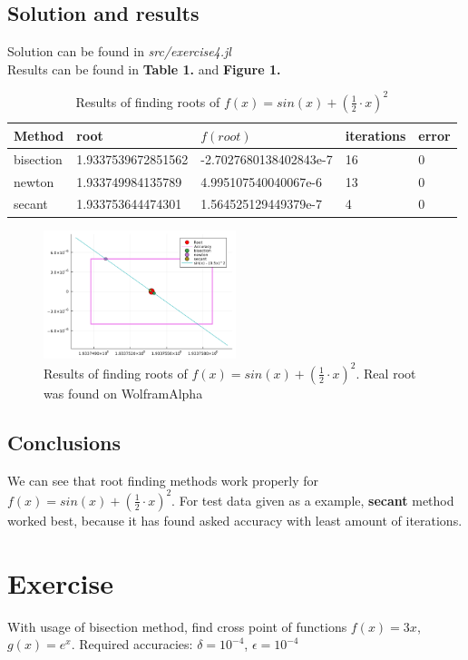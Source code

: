 \documentclass[11pt]{article}
\begin{document}
\subsection{Solution and results}
Solution can be found in \textit{src/exercise4.jl}\\
Results can be found in \textbf{Table 1.} and \textbf{Figure 1.}
\begin{table}[!ht]
    \centering
    \begin{tabular}{|l|l|l|l|l|}
    \hline
        \textbf{Method} & \textbf{root} & \textbf{$f(root)$} & \textbf{iterations} & \textbf{error} \\ \hline
        bisection & 1.9337539672851562 & -2.7027680138402843e-7 & 16 & 0 \\ \hline
        newton & 1.933749984135789 & 4.995107540040067e-6 & 13 & 0 \\ \hline
        secant & 1.933753644474301 & 1.564525129449379e-7 & 4 & 0 \\ \hline
    \end{tabular}
    \caption{Results of finding roots of $f(x) = sin(x) + (\frac{1}{2}\cdot x)^2$}
\end{table}

\begin{figure}[h]
    \centering
    \includegraphics[width=0.5\textwidth]{ex4_plot.png}
    \caption{Results of finding roots of $f(x) = sin(x) + (\frac{1}{2}\cdot x)^2$. Real root was found on WolframAlpha}
\end{figure}
\subsection{Conclusions}
We can see that root finding methods work properly for $f(x) = sin(x) + (\frac{1}{2}\cdot x)^2$.
For test data given as a example, \textbf{secant} method worked best, because it has found asked accuracy with least amount of iterations.

\section{Exercise}
With usage of bisection method, find cross point of functions $f(x) = 3x$, $g(x) = e^x$. Required accuracies: $\delta=10^{-4}$, $\epsilon=10^{-4}$
\end{document}
